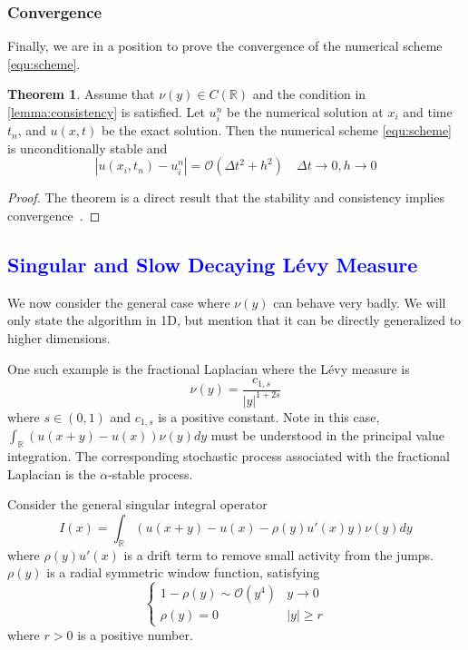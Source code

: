 \documentclass[3p,,preprint,12pt]{elsarticle}
\newcommand{\RR}[0]{\mathbb{R}}
\newcommand{\lib}[1]{\textcolor{blue}{\section{#1}}}
\theoremstyle{definition}
\newtheorem{theorem}{Theorem}
\begin{document}
\subsubsection{Convergence}

Finally, we are in a position to prove the convergence of the numerical scheme \cref{equ:scheme}. 

\begin{theorem}
	Assume that $\nu(y)\in C(\RR)$ and the condition in \cref{lemma:consistency} is satisfied. Let $u_i^n$ be the numerical solution at $x_i$ and time $t_n$, and $u(x, t)$ be the exact solution. Then the numerical scheme \cref{equ:scheme} is unconditionally stable and 
	\begin{equation}
		|u(x_i,t_n)-u_i^n| = \mathcal{O}(\Delta t^2 + h^2) \quad \Delta t \rightarrow 0, h\rightarrow 0
	\end{equation}
\end{theorem}
\begin{proof}
	The theorem is a direct result that the stability and consistency implies convergence~\cite{giles2005convergence}. 
\end{proof}

\lib{Singular and Slow Decaying L\'evy Measure}\label{sect:extension}

We now consider the general case where $\nu(y)$ can behave very badly. We will only state the algorithm in 1D, but mention that it can be directly generalized to higher dimensions. 

One such example is the fractional Laplacian where the L\'evy measure is 
\begin{equation}
	\nu(y) = \frac{c_{1,s}}{|y|^{1+2s}}
\end{equation}
where $s\in (0,1)$ and $c_{1,s}$ is a positive constant. Note in this case, $\int_{\RR}(u(x+y)-u(x))\nu(y)dy$ must be understood in the principal value integration. The corresponding stochastic process associated with the fractional Laplacian is the $\alpha$-stable process. 

Consider the general singular integral operator
\begin{equation}\label{equ:Ix}
	I(x) = \int_{\RR}(u(x+y)-u(x)-\rho(y)u'(x)y)\nu(y)dy
\end{equation}
where $\rho(y)u'(x)$ is a drift term to remove small activity from the jumps. $\rho(y)$ is a radial symmetric window function, satisfying
\begin{equation}\label{equ:rho_condition}
\begin{cases}
	1-\rho(y)\sim \mathcal{O}(y^4)& y\rightarrow 0\\
	\rho(y)=0 & |y|\geq r
\end{cases}
\end{equation}
where $r>0$ is a positive number. 
\end{document}
